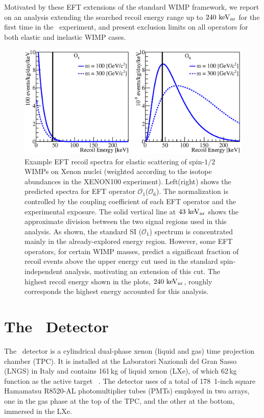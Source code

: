 Motivated by these EFT extensions of the standard WIMP framework, we report on an analysis extending the searched recoil energy range up to $240~\mathrm{keV_\mathrm{nr}}$ for the first time in the \Xehund\ experiment, and present exclusion limits on all operators for both elastic and inelastic WIMP cases.     


\begin{figure}[t!]
\centerline{\includegraphics[width=1.\linewidth]{Figures/drdeO1O6.eps}}
\caption{Example EFT recoil spectra for elastic scattering of spin-$1/2$ WIMPs on Xenon nuclei (weighted according to the isotope abundances in the XENON100 experiment). Left(right) shows the predicted spectra for EFT operator $\mathcal{O}_1$($\mathcal{O}_6$). The normalization is controlled by the coupling coefficient of each EFT operator and the experimental exposure. The solid vertical line at $43~\mathrm{keV_\mathrm{nr}}$ shows the approximate division between the two signal regions used in this analysis. As shown, the standard SI ($\mathcal{O}_1$) spectrum is concentrated mainly in the already-explored energy region. However, some EFT operators, for certain WIMP masses, predict a significant fraction of recoil events above the upper energy cut used in the standard spin-independent analysis, motivating an extension of this cut. The highest recoil energy shown in the plots, $240~\mathrm{keV_\mathrm{nr}}$, roughly corresponds the highest energy accounted for this analysis.}
\label{fig:dRdE}
\end{figure}

\section{The \Xehund\  Detector}
The \Xehund\ detector is a cylindrical %
dual-phase xenon (liquid and gas) time projection chamber (TPC). It is installed at the Laboratori Nazionali del Gran Sasso (LNGS) in Italy
and contains 161\,kg of liquid xenon (LXe), of which 62\,kg function as the active target ~\cite{xe100_instr2012}. 
The detector uses of a total of 178~1-inch square Hamamatsu R8520-AL photomultiplier tubes (PMTs) employed in two arrays, one in the gas phase at the top of the TPC, and the other at the bottom, immersed in the LXe. 

